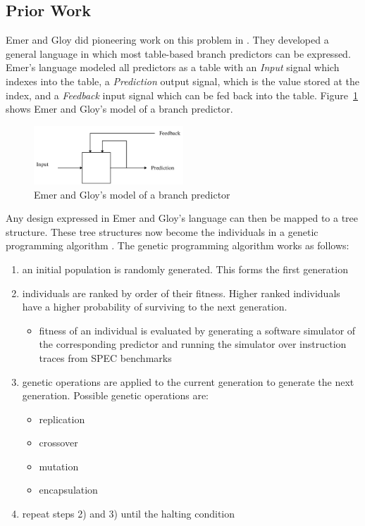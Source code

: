 \documentclass[conference]{IEEEtran}
\begin{document}
\subsection{Prior Work}
Emer and Gloy did pioneering work on this problem in \cite{Emer97}. They developed a general language in which most table-based branch predictors can be expressed. Emer's language modeled all predictors as a table with an \emph{Input} signal which indexes into the table, a \emph{Prediction} output signal, which is the value stored at the index, and a \emph{Feedback} input signal which can be fed back into the table. Figure~\ref{fig:emer} shows Emer and Gloy's model of a branch predictor.

\begin{figure}[h!]
  \centering
    \includegraphics[width=0.5\textwidth]{emer}
    \caption{Emer and Gloy's model of a branch predictor}
    \label{fig:emer}
\end{figure}

Any design expressed in Emer and Gloy's language can then be mapped to a tree structure. These tree structures now become the individuals in a genetic programming algorithm \cite{Koza92}. The genetic programming algorithm works as follows:
\begin{enumerate}
  \item an initial population is randomly generated. This forms the first generation
  \item individuals are ranked by order of their fitness. Higher ranked individuals have a higher probability of surviving to the next generation.
    \begin{itemize}
      \item fitness of an individual is evaluated by generating a software simulator of the corresponding predictor and running the simulator over instruction traces from SPEC benchmarks
    \end{itemize}
  \item genetic operations are applied to the current generation to generate the next generation. Possible genetic operations are:
    \begin{itemize}
    \item replication
    \item crossover
    \item mutation
    \item encapsulation
      \end{itemize}
    \item repeat steps 2) and 3) until the halting condition
\end{enumerate}
\end{document}
